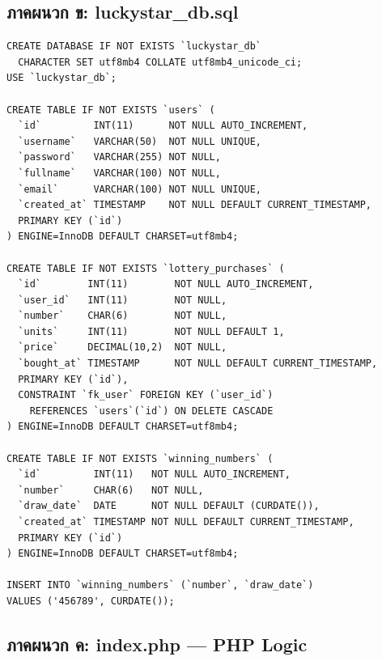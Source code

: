 \documentclass[a4paper,12pt]{article}
\begin{document}
\newpage

\subsection*{ภาคผนวก ข: luckystar\_db.sql}

\begin{lstlisting}[style=sqlstyle, caption={luckystar\_db.sql}]
CREATE DATABASE IF NOT EXISTS `luckystar_db`
  CHARACTER SET utf8mb4 COLLATE utf8mb4_unicode_ci;
USE `luckystar_db`;

CREATE TABLE IF NOT EXISTS `users` (
  `id`         INT(11)      NOT NULL AUTO_INCREMENT,
  `username`   VARCHAR(50)  NOT NULL UNIQUE,
  `password`   VARCHAR(255) NOT NULL,
  `fullname`   VARCHAR(100) NOT NULL,
  `email`      VARCHAR(100) NOT NULL UNIQUE,
  `created_at` TIMESTAMP    NOT NULL DEFAULT CURRENT_TIMESTAMP,
  PRIMARY KEY (`id`)
) ENGINE=InnoDB DEFAULT CHARSET=utf8mb4;

CREATE TABLE IF NOT EXISTS `lottery_purchases` (
  `id`        INT(11)        NOT NULL AUTO_INCREMENT,
  `user_id`   INT(11)        NOT NULL,
  `number`    CHAR(6)        NOT NULL,
  `units`     INT(11)        NOT NULL DEFAULT 1,
  `price`     DECIMAL(10,2)  NOT NULL,
  `bought_at` TIMESTAMP      NOT NULL DEFAULT CURRENT_TIMESTAMP,
  PRIMARY KEY (`id`),
  CONSTRAINT `fk_user` FOREIGN KEY (`user_id`)
    REFERENCES `users`(`id`) ON DELETE CASCADE
) ENGINE=InnoDB DEFAULT CHARSET=utf8mb4;

CREATE TABLE IF NOT EXISTS `winning_numbers` (
  `id`         INT(11)   NOT NULL AUTO_INCREMENT,
  `number`     CHAR(6)   NOT NULL,
  `draw_date`  DATE      NOT NULL DEFAULT (CURDATE()),
  `created_at` TIMESTAMP NOT NULL DEFAULT CURRENT_TIMESTAMP,
  PRIMARY KEY (`id`)
) ENGINE=InnoDB DEFAULT CHARSET=utf8mb4;

INSERT INTO `winning_numbers` (`number`, `draw_date`)
VALUES ('456789', CURDATE());
\end{lstlisting}

\newpage

\subsection*{ภาคผนวก ค: index.php --- PHP Logic}
\end{document}
